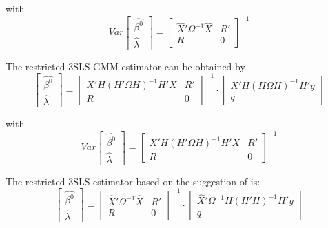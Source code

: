 with
\begin{equation}
   Var 
   \left[ \begin{array}{c}
      \widehat{\beta^0} \\ \widehat{\lambda}
   \end{array} \right] 
   = 
   \left[ \begin{array}{cc}
      \widehat{X}' \Omega^{-1} \widehat{X} & R' \\ 
      R & 0
   \end{array} \right]^{-1}
\end{equation}


The restricted 3SLS-GMM estimator can be obtained by
\begin{equation}
   \left[ \begin{array}{c}
      \widehat{\beta^0} \\ \widehat{\lambda}
   \end{array} \right]
   =
   \left[ \begin{array}{cc}
      X' H \left( H' \Omega H \right)^{-1} H' X & R' \\ 
      R & 0
   \end{array} \right]^{-1}
   \cdot
   \left[ \begin{array}{c}
      X' H \left( H \Omega H \right)^{-1} H' y \\ q 
   \end{array} \right]
\end{equation}

with
\begin{equation}
   Var 
   \left[ \begin{array}{c}
      \widehat{\beta^0} \\ \widehat{\lambda}
   \end{array} \right] 
   = 
   \left[ \begin{array}{cc}
      X' H \left( H' \Omega H \right)^{-1} H' X & R' \\ 
      R & 0
   \end{array} \right]^{-1}
\end{equation}


The restricted 3SLS estimator based on the suggestion of 
\cite{schmidt90} is:
\begin{equation}
   \left[ \begin{array}{c}
      \widehat{\beta^0} \\ \widehat{\lambda}
   \end{array} \right]
   =
   \left[ \begin{array}{cc}
      \widehat{X}' \Omega^{-1} \widehat{X} & R' \\ 
      R & 0
   \end{array} \right]^{-1}
   \cdot
   \left[ \begin{array}{c}
      \widehat{X}' \Omega^{-1} H \left( H' H \right)^{-1} H' y \\ q 
   \end{array} \right]
\end{equation}

